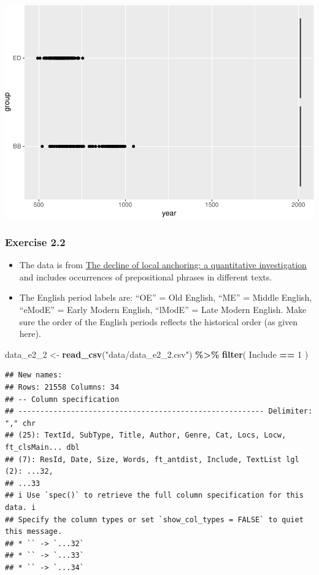 \documentclass[
]{article}
\newenvironment{Shaded}{\begin{snugshade}}{\end{snugshade}}
\newcommand{\DecValTok}[1]{\textcolor[rgb]{0.00,0.00,0.81}{#1}}
\newcommand{\FunctionTok}[1]{\textcolor[rgb]{0.13,0.29,0.53}{\textbf{#1}}}
\newcommand{\NormalTok}[1]{#1}
\newcommand{\OtherTok}[1]{\textcolor[rgb]{0.56,0.35,0.01}{#1}}
\newcommand{\SpecialCharTok}[1]{\textcolor[rgb]{0.81,0.36,0.00}{\textbf{#1}}}
\newcommand{\StringTok}[1]{\textcolor[rgb]{0.31,0.60,0.02}{#1}}
\providecommand{\tightlist}{%
  \setlength{\itemsep}{0pt}\setlength{\parskip}{0pt}}
\begin{document}
\includegraphics{analysis_files/figure-latex/e2-1-1.pdf}

\subsubsection{Exercise 2.2}\label{exercise-2.2}

\begin{itemize}
\tightlist
\item
  The data is from \href{https://doi.org/10.1017/S1360674323000047}{The
  decline of local anchoring: a quantitative investigation} and includes
  occurrences of prepositional phrases in different texts.
\item
  The English period labels are: ``OE'' = Old English, ``ME'' = Middle
  English, ``eModE'' = Early Modern English, ``lModE'' = Late Modern
  English. Make sure the order of the English periods reflects the
  historical order (as given here).
\end{itemize}

\begin{Shaded}
\begin{Highlighting}[]
\NormalTok{data\_e2\_2 }\OtherTok{\textless{}{-}} \FunctionTok{read\_csv}\NormalTok{(}\StringTok{"data/data\_e2\_2.csv"}\NormalTok{) }\SpecialCharTok{\%\textgreater{}\%}
  \FunctionTok{filter}\NormalTok{(}
\NormalTok{    Include }\SpecialCharTok{==} \DecValTok{1}
\NormalTok{  )}
\end{Highlighting}
\end{Shaded}

\begin{verbatim}
## New names:
## Rows: 21558 Columns: 34
## -- Column specification
## -------------------------------------------------------- Delimiter: "," chr
## (25): TextId, SubType, Title, Author, Genre, Cat, Locs, Locw, ft_clsMain... dbl
## (7): ResId, Date, Size, Words, ft_antdist, Include, TextList lgl (2): ...32,
## ...33
## i Use `spec()` to retrieve the full column specification for this data. i
## Specify the column types or set `show_col_types = FALSE` to quiet this message.
## * `` -> `...32`
## * `` -> `...33`
## * `` -> `...34`
\end{verbatim}
\end{document}
